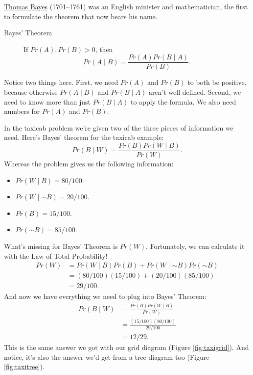 \documentclass[justified]{tufte-book}
\providecommand{\tightlist}{%
  \setlength{\itemsep}{0pt}\setlength{\parskip}{0pt}}
\newcommand{\given}{\mid}
\renewcommand{\neg}{\mathbin{\sim}}
\newcommand{\p}{Pr}
\theoremstyle{definition}
\theoremstyle{definition}
\theoremstyle{definition}
\theoremstyle{remark}
\begin{document}
\begin{marginfigure}
\href{https://en.wikipedia.org/wiki/Thomas_Bayes}{Thomas Bayes}
(1701--1761) was an English minister and mathematician, the first to
formulate the theorem that now bears his name.
\end{marginfigure}

\begin{description}
\item[Bayes' Theorem]
If \(\p(A),\p(B)>0\), then
\[ \p(A \given B) = \frac{\p(A)\p(B \given A)}{\p(B)}. \]
\end{description}

Notice two things here. First, we need \(\p(A)\) and \(\p(B)\) to both be positive, because otherwise \(\p(A \given B)\) and \(\p(B \given A)\) aren't well-defined. Second, we need to know more than just \(\p(B \given A)\) to apply the formula. We also need numbers for \(\p(A)\) and \(\p(B)\).

In the taxicab problem we're given two of the three pieces of information we need. Here's Bayes' theorem for the taxicab example:
\[ \p(B \given W) = \frac{\p(B) \p(W \given B)}{\p(W)}. \]
Whereas the problem gives us the following information:

\begin{itemize}
\tightlist
\item
  \(\p(W \given B) = 80/100\).
\item
  \(\p(W \given \neg B) = 20/100\).
\item
  \(\p(B) = 15/100\).
\item
  \(\p(\neg B) = 85/100\).
\end{itemize}

What's missing for Bayes' Theorem is \(\p(W)\). Fortunately, we can calculate it with the Law of Total Probability!
\[
  \begin{aligned}
    \p(W) &= \p(W \given B)\p(B) + \p(W \given \neg B)\p(\neg B)\\
          &= (80/100)(15/100) + (20/100)(85/100)\\
          &= 29/100.
  \end{aligned}
\]
And now we have everything we need to plug into Bayes' Theorem:
\[
  \begin{aligned}
    \p(B \given W) &= \frac{\p(B) \p(W \given B)}{\p(W)}\\
                   &= \frac{(15/100)(80/100)}{29/100}\\
                   &= 12/29.
  \end{aligned}
\]
This is the same answer we got with our grid diagram (Figure \ref{fig:taxigrid}). And notice, it's also the answer we'd get from a tree diagram too (Figure \ref{fig:taxitree}).
\end{document}
